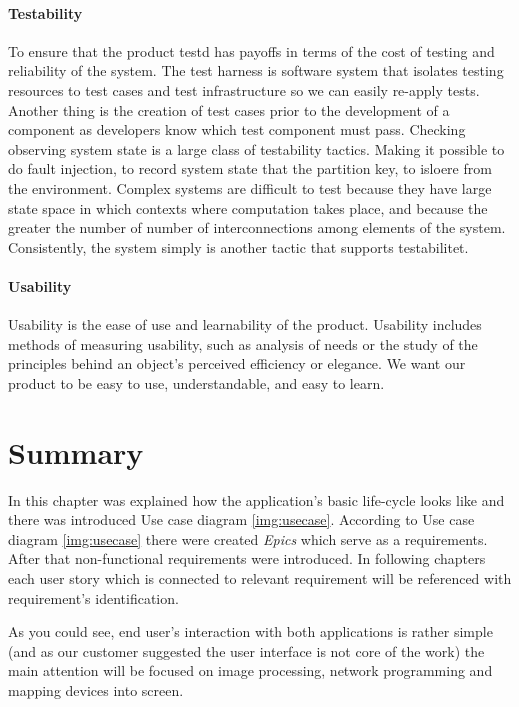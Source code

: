 \paragraph{Testability}

To ensure that the product testd has payoffs in terms of the cost of testing and reliability of the system. The test harness is software system that isolates testing resources to test cases and test infrastructure so we can easily re-apply tests. Another thing is the creation of test cases prior to the development of a component as developers know which test component must pass. Checking observing system state is a large class of testability tactics. Making it possible to do fault injection, to record system state that the partition key, to isloere from the environment. Complex systems are difficult to test because they have large state space in which contexts where computation takes place, and because the greater the number of number of interconnections among elements of the system. Consistently, the system simply is another tactic that supports testabilitet.

\paragraph{Usability}
Usability is the ease of use and learnability of the product.
Usability includes methods of measuring usability, such as analysis of needs or the study of the principles behind an object's perceived efficiency or elegance. We want our product to be easy to use, understandable, and easy to learn.  

\section{Summary}
In this chapter was explained how the application's basic life-cycle looks like and there was introduced Use case diagram \ref{img:usecase}.
According to Use case diagram \ref{img:usecase} there were created \emph{Epics} which serve as a requirements. 
After that non-functional requirements were introduced.
In following chapters each user story which is connected to relevant requirement will be referenced with requirement's identification.

As you could see, end user's interaction with both applications is rather simple (and as our customer suggested the user interface is not core of the work) the main attention will be focused on image processing, network programming and mapping devices into screen.

